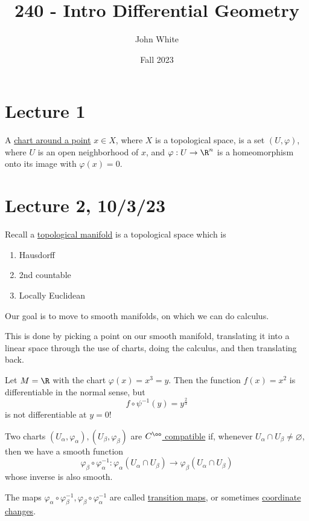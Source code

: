 \documentclass[x11names,reqno,14pt]{extarticle}
\title{240 - Intro Differential Geometry}
\author{John White}
\date{Fall 2023}
\renewcommand{\phi}{\varphi}
\begin{document}
\section*{Lecture 1}


A \underline{chart around a point} $x \in X$, where $X$ is a topological space, is a set $(U, \phi)$, where $U$ is an open neighborhood of $x$, and $\phi:U\to\R^n$ is a homeomorphism onto its image with $\phi(x) = 0$.

\section*{Lecture 2, 10/3/23}

Recall a \underline{topological manifold} is a topological space which is 
\begin{enumerate}

\item Hausdorff

\item 2nd countable

\item Locally Euclidean

\end{enumerate}

Our goal is to move to smooth manifolds, on which we can do calculus. 

This is done by picking a point on our smooth manifold, translating it into a linear space through the use of charts, doing the calculus, and then translating back. 

\exm

Let $M = \R$ with the chart $\phi(x) = x^3 = y$. Then the function $f(x) = x^2$ is differentiable in the normal sense, but 
\[
f\circ\psi^{-1}(y) = y^{\frac23}
\]
is not differentiable at $y = 0$!


Two charts $(U_\alpha, \phi_\alpha), (U_\beta, \phi_\beta)$ are \underline{$C^\oo$ compatible} if, whenever $U_\alpha \cap U_\beta \neq \varnothing$, then we have a smooth function
\[
\phi_\beta \circ \phi_\alpha^{-1}:\phi_\alpha(U_\alpha \cap U_\beta) \to \phi_\beta(U_\alpha \cap U_\beta)
\]
whose inverse is also smooth. 

The maps $\phi_\alpha \circ \phi_\beta^{-1}, \phi_\beta \circ \phi_\alpha^{-1}$ are called \underline{transition maps}, or sometimes \underline{coordinate changes}.

\exm
\end{document}
